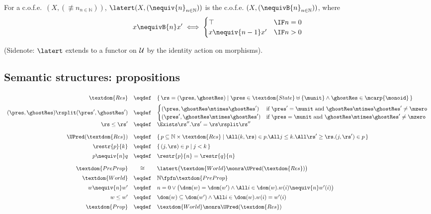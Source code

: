 For a c.o.f.e.\ $(X,(\nequiv{n}_{n\in\mathbb{N}}))$, 
$\latert (X,(\nequiv{n}_{n\in\mathbb{N}}))$ is the c.o.f.e.\@
$(X,(\nequivB{n}_{n\in\mathbb{N}}))$,  where
\[
x \nequivB{n} x' \iff \begin{cases}
\top	&\IF n=0 \\
x \nequiv{n-1} x' &\IF n>0
\end{cases}
\]

(Sidenote: $\latert$ extends to a functor on $\cal U$ by the identity
action on morphisms).


\subsection{Semantic structures: propositions}

\[
\begin{array}[t]{rcl}
\textdom{Res} &\eqdef&
\{\, \rs = (\pres, \ghostRes) \mid
\pres \in \textdom{State} \uplus \{\munit\} \land \ghostRes \in \mcarp{\monoid} \,\} \\[0.5em]
(\pres, \ghostRes) \rsplit
(\pres', \ghostRes') &\eqdef&
\begin{cases}
(\pres, \ghostRes \mtimes \ghostRes')  & \mbox{if $\pres' = \munit$ and $\ghostRes \mtimes \ghostRes' \neq \mzero$} \\
(\pres', \ghostRes \mtimes \ghostRes') & \mbox{if $\pres = \munit$ and $\ghostRes \mtimes \ghostRes' \neq \mzero$}
\end{cases}
\\[0.5em]
%
\rs \leq \rs' & \eqdef &
\Exists \rs''. \rs' = \rs \rsplit \rs''\\[1em]
%
\UPred(\textdom{Res}) &\eqdef& 
\{\, p \subseteq \mathbb{N} \times \textdom{Res} \mid
\All (k,\rs) \in p.
\All j\leq k.
\All \rs' \geq \rs.
(j,\rs')\in p \,\}\\[0.5em]
\restr{p}{k} &\eqdef& 
\{\, (j, \rs) \in p \mid j < k \,\}\\[0.5em]
p \nequiv{n} q & \eqdef & \restr{p}{n} = \restr{q}{n}\\[1em]
%
\textdom{PreProp} & \cong  &
\latert\big( \textdom{World} \monra \UPred(\textdom{Res})
\big)\\[0.5em]
%
\textdom{World} & \eqdef &
\mathbb{N} \fpfn \textdom{PreProp}\\[0.5em]
%
w \nequiv{n} w' & \eqdef & 
n = 0 \lor
\bigl(\dom(w) = \dom(w') \land \All i\in\dom(w). w(i) \nequiv{n} w'(i)\bigr)
\\[0.5em]
%
w \leq w' & \eqdef & 
\dom(w) \subseteq \dom(w') \land \All i \in \dom(w). w(i) = w'(i) 
\\[0.5em]
%
\textdom{Prop} & \eqdef & \textdom{World} \monra \UPred(\textdom{Res})
\end{array}
\]

